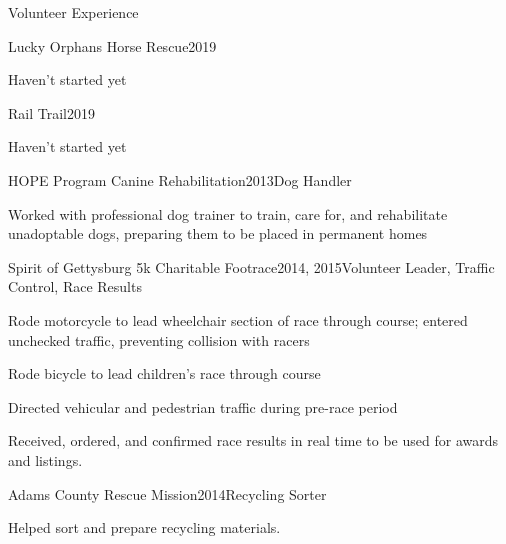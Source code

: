 \documentclass{resume} %
\begin{document}
\iffalse
\begin{rSection}{Volunteer Experience}


\begin{rWorkSubsection}{Lucky Orphans Horse Rescue}{2019}{}{}
\item Haven't started yet
\end{rWorkSubsection}


\begin{rWorkSubsection}{Rail Trail}{2019}{}{}
\item Haven't started yet
\end{rWorkSubsection}


\begin{rWorkSubsection}{HOPE Program Canine Rehabilitation}{2013}{Dog Handler}{}
\item Worked with professional dog trainer to train, care for, and rehabilitate unadoptable dogs, preparing them to be placed in permanent homes
\end{rWorkSubsection}


\begin{rWorkSubsection}{Spirit of Gettysburg 5k Charitable Footrace}{2014, 2015}{Volunteer Leader, Traffic Control, Race Results}{}
\item Rode motorcycle to lead wheelchair section of race through course; entered unchecked traffic, preventing collision with racers
\item Rode bicycle to lead children's race through course
\item Directed vehicular and pedestrian traffic during pre-race period
\item Received, ordered, and confirmed race results in real time to be used for awards and listings.
\end{rWorkSubsection}


\begin{rWorkSubsection}{Adams County Rescue Mission}{2014}{Recycling Sorter}{}
\item Helped sort and prepare recycling materials.
\end{rWorkSubsection}


\end{rSection}
\end{document}
